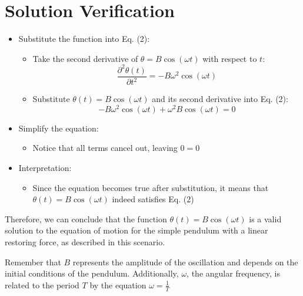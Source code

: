 \section{Solution Verification}

\begin{itemize}
	\item Substitute the function into Eq. (2):
		\begin{itemize}
			\item Take the second derivative of $\theta = B\cos(\omega t)$ with respect to $t$: 
				\[\frac{\partial ^{2}\theta (t)}{\partial t^{2}} = -B\omega^{2}\cos(\omega t)\]
			\item Substitute $\theta (t) = B\cos(\omega t)$ and its second derivative into Eq. (2): 
				\[-B\omega^{2}\cos(\omega t) + \omega^{2}B\cos(\omega t) = 0\]
		\end{itemize}
	\item Simplify the equation:
		\begin{itemize}
			\item Notice that all terms cancel out, leaving $0 = 0$
		\end{itemize}
	\item Interpretation:
		\begin{itemize}
			\item Since the equation becomes true after substitution, it means that ${\theta (t) = B\cos(\omega t)}$ indeed satisfies Eq. (2)
		\end{itemize}
\end{itemize}

Therefore, we can conclude that the function $\theta (t) = B\cos(\omega t)$ is a valid solution to the equation of motion for the simple pendulum with a linear restoring force, as described in this scenario.

Remember that $B$ represents the amplitude of the oscillation and depends on the initial conditions of the pendulum. Additionally, $\omega$, the angular frequency, is related to the period $T$ by the equation  $\omega = \frac{1}{T}$
